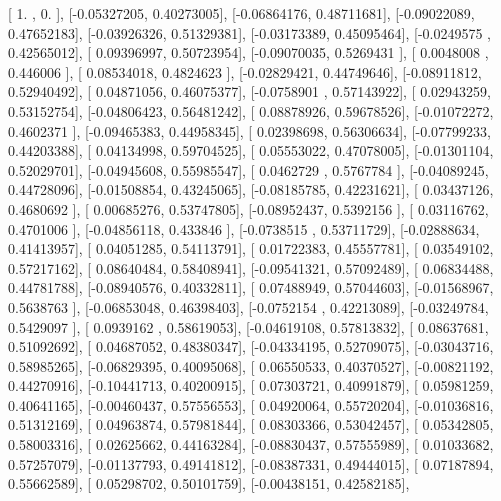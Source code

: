 \documentclass{article}
\begin{document}
       [ 1.        ,  0.        ],
       [-0.05327205,  0.40273005],
       [-0.06864176,  0.48711681],
       [-0.09022089,  0.47652183],
       [-0.03926326,  0.51329381],
       [-0.03173389,  0.45095464],
       [-0.0249575 ,  0.42565012],
       [ 0.09396997,  0.50723954],
       [-0.09070035,  0.5269431 ],
       [ 0.0048008 ,  0.446006  ],
       [ 0.08534018,  0.4824623 ],
       [-0.02829421,  0.44749646],
       [-0.08911812,  0.52940492],
       [ 0.04871056,  0.46075377],
       [-0.0758901 ,  0.57143922],
       [ 0.02943259,  0.53152754],
       [-0.04806423,  0.56481242],
       [ 0.08878926,  0.59678526],
       [-0.01072272,  0.4602371 ],
       [-0.09465383,  0.44958345],
       [ 0.02398698,  0.56306634],
       [-0.07799233,  0.44203388],
       [ 0.04134998,  0.59704525],
       [ 0.05553022,  0.47078005],
       [-0.01301104,  0.52029701],
       [-0.04945608,  0.55985547],
       [ 0.0462729 ,  0.5767784 ],
       [-0.04089245,  0.44728096],
       [-0.01508854,  0.43245065],
       [-0.08185785,  0.42231621],
       [ 0.03437126,  0.4680692 ],
       [ 0.00685276,  0.53747805],
       [-0.08952437,  0.5392156 ],
       [ 0.03116762,  0.4701006 ],
       [-0.04856118,  0.433846  ],
       [-0.0738515 ,  0.53711729],
       [-0.02888634,  0.41413957],
       [ 0.04051285,  0.54113791],
       [ 0.01722383,  0.45557781],
       [ 0.03549102,  0.57217162],
       [ 0.08640484,  0.58408941],
       [-0.09541321,  0.57092489],
       [ 0.06834488,  0.44781788],
       [-0.08940576,  0.40332811],
       [ 0.07488949,  0.57044603],
       [-0.01568967,  0.5638763 ],
       [-0.06853048,  0.46398403],
       [-0.0752154 ,  0.42213089],
       [-0.03249784,  0.5429097 ],
       [ 0.0939162 ,  0.58619053],
       [-0.04619108,  0.57813832],
       [ 0.08637681,  0.51092692],
       [ 0.04687052,  0.48380347],
       [-0.04334195,  0.52709075],
       [-0.03043716,  0.58985265],
       [-0.06829395,  0.40095068],
       [ 0.06550533,  0.40370527],
       [-0.00821192,  0.44270916],
       [-0.10441713,  0.40200915],
       [ 0.07303721,  0.40991879],
       [ 0.05981259,  0.40641165],
       [-0.00460437,  0.57556553],
       [ 0.04920064,  0.55720204],
       [-0.01036816,  0.51312169],
       [ 0.04963874,  0.57981844],
       [ 0.08303366,  0.53042457],
       [ 0.05342805,  0.58003316],
       [ 0.02625662,  0.44163284],
       [-0.08830437,  0.57555989],
       [ 0.01033682,  0.57257079],
       [-0.01137793,  0.49141812],
       [-0.08387331,  0.49444015],
       [ 0.07187894,  0.55662589],
       [ 0.05298702,  0.50101759],
       [-0.00438151,  0.42582185],
\end{document}
